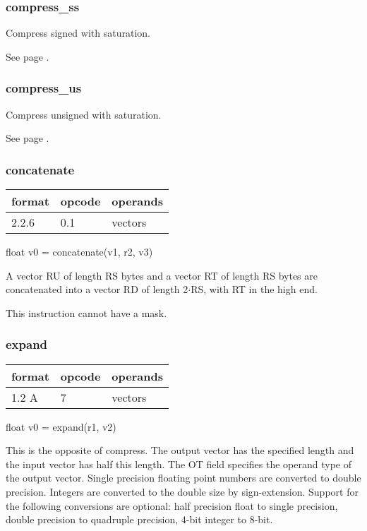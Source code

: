 \documentclass[forwardcom.tex]{subfiles}
\begin{document}
\subsubsection{compress\_ss}
Compress signed with saturation.

See page \pageref{table:compressSsInstruction}.

\subsubsection{compress\_us}
Compress unsigned with saturation.

See page \pageref{table:compressUsInstruction}.

\subsubsection{concatenate}
\label{table:concatenateInstruction}
\begin{tabular}{|p{12mm}|p{12mm}|p{110mm}|}
\hline
\bfseries format & \bfseries opcode & \bfseries operands \\ \hline
2.2.6 & 0.1 & vectors \\ \hline
\end{tabular}
\vspace{2mm}

float v0 = concatenate(v1, r2, v3)
\vspace{2mm}

A vector RU of length RS bytes and a vector RT of
length RS bytes are concatenated into a vector RD
of length 2$\cdot$RS, with RT in the high end.
\vspace{2mm}

This instruction cannot have a mask.


\subsubsection{expand}
\label{table:expandInstruction}
\begin{tabular}{|p{12mm}|p{12mm}|p{110mm}|}
\hline
\bfseries format & \bfseries opcode & \bfseries operands \\ \hline
1.2 A & 7 & vectors \\ \hline
\end{tabular}
\vspace{2mm}

float  v0 = expand(r1, v2)
\vspace{2mm}

This is the opposite of compress. The output vector has the specified length and the input vector has half this length. The OT field specifies the operand type of the output vector. Single precision floating point numbers are converted to double precision. Integers are converted to the double size by sign-extension. Support for the following conversions are optional: half precision float to single precision, double precision to quadruple precision, 4-bit integer to 8-bit.
\vspace{2mm}
\end{document}
